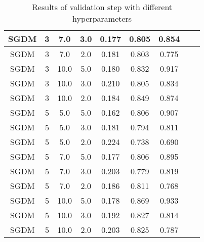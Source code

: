 \begin{table}[h]
\begin{tabular}{|c|c|c|c|c|c|c|c|c|}
        SGDM & 3 & 7.0 & 3.0 & 0.177 & 0.805 & 0.854 \\ \hline
        SGDM & 3 & 7.0 & 2.0 & 0.181 & 0.803 & 0.775 \\ \hline
        SGDM & 3 & 10.0 & 5.0 & 0.180 & 0.832 & 0.917 \\ \hline
        SGDM & 3 & 10.0 & 3.0 & 0.210 & 0.805 & 0.834 \\ \hline
        SGDM & 3 & 10.0 & 2.0 & 0.184 & 0.849 & 0.874 \\ \hline
        SGDM & 5 & 5.0 & 5.0 & 0.162 & 0.806 & 0.907 \\ \hline
        SGDM & 5 & 5.0 & 3.0 & 0.181 & 0.794 & 0.811 \\ \hline
        SGDM & 5 & 5.0 & 2.0 & 0.224 & 0.738 & 0.690 \\ \hline
        SGDM & 5 & 7.0 & 5.0 & 0.177 & 0.806 & 0.895 \\ \hline
        SGDM & 5 & 7.0 & 3.0 & 0.203 & 0.779 & 0.819 \\ \hline
        SGDM & 5 & 7.0 & 2.0 & 0.186 & 0.811 & 0.768 \\ \hline
        SGDM & 5 & 10.0 & 5.0 & 0.178 & 0.869 & 0.933 \\ \hline
        SGDM & 5 & 10.0 & 3.0 & 0.192 & 0.827 & 0.814 \\ \hline
        SGDM & 5 & 10.0 & 2.0 & 0.203 & 0.825 & 0.787 \\ \hline
    \end{tabular}
    \caption{Results of validation step with different hyperparameters}\label{tab:validation_step}
\end{table}
